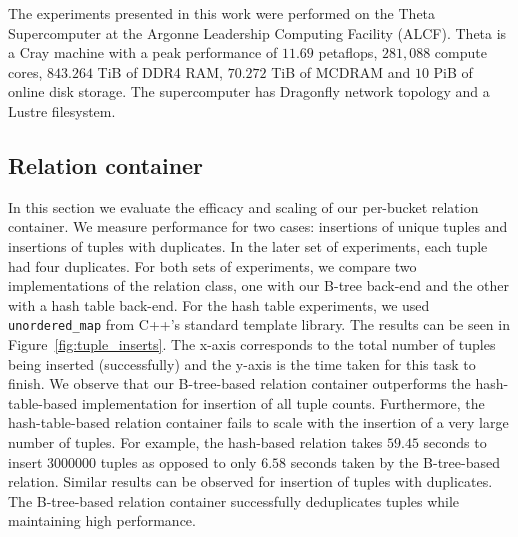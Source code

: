 
The experiments presented in this work were performed on
the Theta Supercomputer at the Argonne Leadership Computing Facility
(ALCF). Theta is a Cray machine with a peak
performance of $11.69$ petaflops, $281,\!088$ compute cores, $843.264$
TiB of DDR4 RAM, $70.272$ TiB of MCDRAM and $10$ PiB of online disk storage. 
The supercomputer has Dragonfly network topology and a Lustre filesystem.



\subsection{Relation container}
\label{sec:relation}

In this section we evaluate the efficacy and scaling of our per-bucket relation container. We measure performance for two cases: insertions of unique tuples and insertions of tuples with duplicates. In the later set of experiments, each tuple had four duplicates. For both sets of experiments, we compare two implementations of the relation class, one with our B-tree back-end and the other with a hash table back-end. For the hash table experiments, we used \texttt{unordered\_map} from C++'s standard template library. The results can be seen in Figure~\ref{fig:tuple_inserts}. The x-axis corresponds to the total number of tuples being inserted (successfully) and the y-axis is the time taken for this task to finish. We observe that our B-tree-based relation container outperforms the hash-table-based implementation for insertion of all tuple counts. Furthermore, the hash-table-based relation container fails to scale with the insertion of a very large number of tuples. For example, the hash-based relation takes $59.45$ seconds to insert $3000000$ tuples as opposed to only $6.58$ seconds taken by the B-tree-based relation. Similar results can be observed for insertion of tuples with duplicates. The B-tree-based relation container successfully deduplicates tuples while maintaining high performance.


